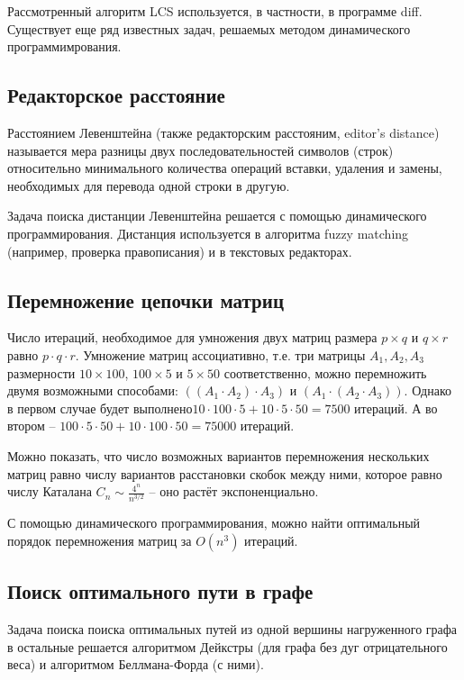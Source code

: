 \documentclass[11pt]{article}
\begin{document}
Рассмотренный алгоритм LCS используется, в частности, в программе diff. Существует еще ряд известных задач, решаемых методом динамического программимрования.

\subsection{Редакторское расстояние}

Расстоянием Левенштейна (также редакторским расстояним, editor's distance) называется мера разницы двух последовательностей символов (строк) относительно минимального количества операций вставки, удаления и замены, необходимых для перевода одной строки в другую.

Задача поиска дистанции Левенштейна решается с помощью динамического программирования. Дистанция используется в алгоритма fuzzy matching (например, проверка правописания) и в текстовых редакторах.

\subsection{Перемножение цепочки матриц}

Число итераций, необходимое для умножения двух матриц размера $p \times q$ и $q \times r$ равно $p \cdot q \cdot r$. Умножение матриц ассоциативно, т.е. три матрицы $A_1, A_2, A_3$ размерности $10 \times 100$, $100 \times 5$ и $5 \times 50$ соответственно, можно перемножить двумя возможными способами: $((A_1 \cdot A_2) \cdot A_3)$ и $(A_1 \cdot (A_2 \cdot A_3))$. Однако в первом случае будет выполнено$10 \cdot 100 \cdot 5 + 10 \cdot 5 \cdot 50 = 7500$ итераций. А во втором -- $100 \cdot 5 \cdot 50 + 10 \cdot 100 \cdot 50 = 75000$ итераций.

Можно показать, что число возможных вариантов перемножения нескольких матриц равно числу вариантов расстановки скобок между ними, которое равно числу Каталана $C_n \sim \frac{4^n}{n^{3/2}}$ -- оно растёт экспоненциально.

С помощью динамического программирования, можно найти оптимальный порядок перемножения матриц за $O(n^3)$ итераций.

\subsection{Поиск оптимального пути в графе}

Задача поиска поиска оптимальных путей из одной вершины нагруженного графа в остальные решается алгоритмом Дейкстры (для графа без дуг отрицательного веса) и алгоритмом Беллмана-Форда (с ними). 
\end{document}
